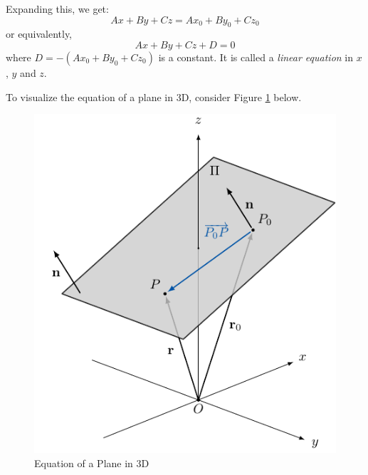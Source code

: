 \documentclass{book}
\theoremstyle{remark}
\begin{document}
Expanding this, we get:
\[
    Ax + By + Cz = Ax_0 + By_0 + Cz_0
\]
or equivalently,
\[
    Ax + By + Cz + D = 0
\]
where $D = -(Ax_0 + By_0 + Cz_0)$ is a constant. It is called a \emph{linear equation} in $x$, $y$ and $z$.

To visualize the equation of a plane in 3D, consider Figure \ref{fig:3d_plane_equation} below.
\begin{figure}[ht]
    \centering
    \includegraphics{figures/3d_plane_equation.pdf}
    \caption{Equation of a Plane in 3D}\label{fig:3d_plane_equation}
\end{figure}
\end{document}
